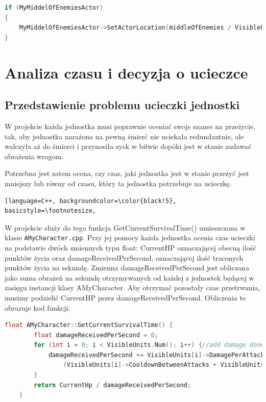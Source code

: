 \documentclass[12pt]{report}
\begin{document}
\begin{lstlisting}[language=C++, backgroundcolor=\color{black!5}, basicstyle=\footnotesize, caption=Ustawienie pozycji komponentu MyMiddelOfEnemiesActor w funkcji GetMiddleOfEnemies();]
if (MyMiddelOfEnemiesActor)
{
	MyMiddelOfEnemiesActor->SetActorLocation(middleOfEnemies / VisibleUnits.Num());
}
\end{lstlisting}

\section{Analiza czasu i decyzja o ucieczce}
\subsection{Przedstawienie problemu ucieczki jednostki}
W projekcie każda jednostka musi poprawnie oceniać swoje szanse na przeżycie, tak, aby jednostka narażona na pewną śmierć nie uciekała redundantnie, ale walczyła aż do śmierci i przynosiła zysk w bitwie dopóki jest w stanie zadawać obrażenia wrogom.

Potrzebna jest zatem ocena, czy czas, jaki jednostka jest w stanie przeżyć jest mniejszy lub równy od czasu, który ta jednostka potrzebuje na ucieczkę.

\begin{lstlisting}[language=C++, backgroundcolor=\color{black!5}, basicstyle=\footnotesize, 

\end{lstlisting}


W projekcie służy do tego funkcja GetCurrentSurvivalTime() umieszczona w klasie \texttt{AMyCharacter.cpp}. Przy jej pomocy każda jednostka ocenia czas ucieczki na podstawie dwóch zmiennych typu float: CurrentHP oznaczającej obecną ilość punktów życia oraz damageReceivedPerSecond, oznaczającej ilość traconych punktów życia na sekundę. Zmienna damageReceivedPerSecond jest obliczana jako suma obrażeń na sekundę otrzymywanych od każdej z jednostek będącej w zasięgu instancji klasy AMyCharacter. Aby otrzymać pozostały czas przetrwania, musimy podzielić CurrentHP przez damageReceivedPerSecond. Obliczenia te obrazuje kod funkcji:

\begin{lstlisting}[language=C++, backgroundcolor=\color{black!5}, basicstyle=\footnotesize, caption=Funkcja GetCurrentSurvivalTime w klasie \texttt{AMyCharacter.cpp}.]
    float AMyCharacter::GetCurrentSurvivalTime() {
		float damageReceivedPerSecond = 0;
		for (int i = 0; i < VisibleUnits.Num(); i++) {//add damage done by single unit to sum, all given values are in seconds
			damageReceivedPerSecond += VisibleUnits[i]->DamagePerAttack /
				(VisibleUnits[i]->CooldownBetweenAttacks + VisibleUnits[i]->AttackDuration);
		}
		return CurrentHp / damageReceivedPerSecond;
	}
\end{lstlisting}
\end{document}
